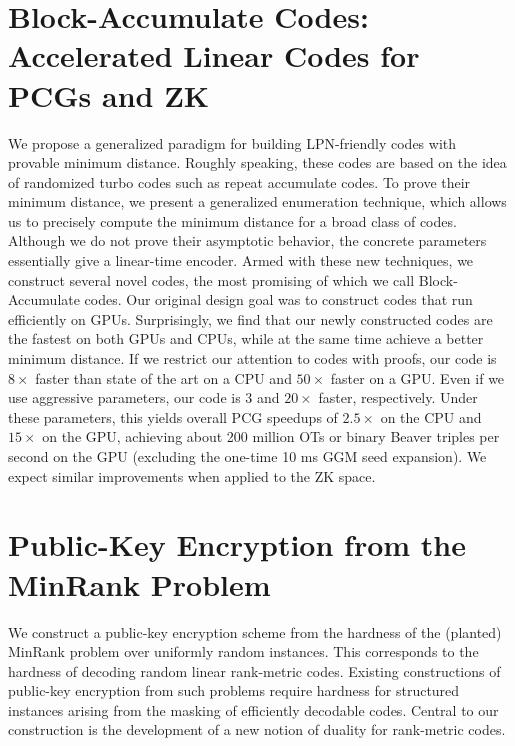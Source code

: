 \documentclass[11pt,oneside]{book}
\theoremstyle{definition}
\theoremstyle{remark}
\theoremstyle{plain}
\begin{document}
 \section{\cite{cryptoeprint:2025/1828} Block-Accumulate Codes: Accelerated Linear Codes for PCGs and ZK}
 We propose a generalized paradigm for building LPN-friendly codes with provable minimum distance. Roughly speaking, these codes are based on the idea of randomized turbo codes such as repeat accumulate codes. To prove their minimum distance, we present a generalized enumeration technique, which allows us to precisely compute the minimum distance for a broad class of codes. Although we do not prove their asymptotic behavior, the concrete parameters essentially give a linear-time encoder. Armed with these new techniques, we construct several novel codes, the most promising of which we call Block-Accumulate codes. Our original design goal was to construct codes that run efficiently on GPUs. Surprisingly, we find that our newly constructed codes are the fastest on both GPUs and CPUs, while at the same time achieve a better minimum distance. If we restrict our attention to codes with proofs, our code is $8\times$ faster than state of the art on a CPU and $50\times$ faster on a GPU. Even if we use aggressive parameters, our code is $3$ and $20\times$ faster, respectively. Under these parameters, this yields overall PCG speedups of $2.5\times$ on the CPU and $15\times$ on the GPU, achieving about 200 million OTs or binary Beaver triples per second on the GPU (excluding the one-time 10 ms GGM seed expansion). We expect similar improvements when applied to the ZK space.
 
 \section{\cite{cryptoeprint:2025/1833} Public-Key Encryption from the MinRank Problem}
 We construct a public-key encryption scheme from the hardness of the (planted) MinRank problem over uniformly random instances. This corresponds to the hardness of decoding random linear rank-metric codes. Existing constructions of public-key encryption from such problems require hardness for structured instances arising from the masking of efficiently decodable codes. Central to our construction is the development of a new notion of duality for rank-metric codes.
 
 
\end{document}
